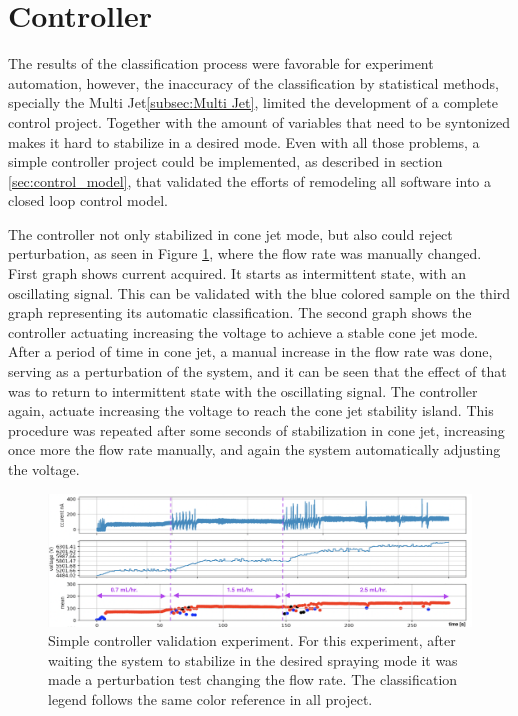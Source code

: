 \section{Controller}
\label{sec:controller_results}

    The results of the classification process were favorable for experiment automation, however, the inaccuracy of the classification by statistical methods, specially the Multi Jet\ref{subsec:Multi Jet}, limited the development of a complete control project.
    Together with the amount of variables that need to be syntonized makes it hard to stabilize in a desired mode.
    Even with all those problems, a simple controller project could be implemented, as described in section \ref{sec:control_model}, that validated the efforts of remodeling all software into a closed loop control model.
    
    The controller not only stabilized in cone jet mode, but also could reject perturbation, as seen in Figure \ref{fig:control_results}, where the flow rate was manually changed.
    First graph shows current acquired. It starts as intermittent state, with an oscillating signal. This can be validated with the blue colored sample on the third graph representing its automatic classification. 
    The second graph shows the controller actuating increasing the voltage to achieve a stable cone jet mode.
    After a period of time in cone jet, a manual increase in the flow rate was done, serving as a perturbation of the system, and it can be seen that the effect of that was to return to intermittent state with the oscillating signal. The controller again, actuate increasing the voltage to reach the cone jet stability island. 
    This procedure was repeated after some seconds of stabilization in cone jet, increasing once more the flow rate manually, and again the system automatically adjusting the voltage.
        \begin{figure}[H]
            \center
            \includegraphics[width=16cm]{Figuras/19:03/control_first_results.png}
            \caption{Simple controller validation experiment. For this experiment, after waiting the system to stabilize in the desired spraying mode it was made a perturbation test changing the flow rate. The classification legend follows the same color reference in all project.}
            \label{fig:control_results}
        \end{figure}

